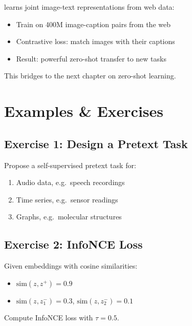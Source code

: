 
 learns joint image-text representations from web data:
\begin{itemize}
    \item Train on 400M image-caption pairs from the web
    \item Contrastive loss: match images with their captions
    \item Result: powerful zero-shot transfer to new tasks
\end{itemize}

This bridges to the next chapter on zero-shot learning.



\newpage
\section{Examples \& Exercises}

\subsection{Exercise 1: Design a Pretext Task}

Propose a self-supervised pretext task for:
\begin{enumerate}
    \item Audio data, e.g.\ speech recordings
    \item Time series, e.g.\ sensor readings
    \item Graphs, e.g.\ molecular structures
\end{enumerate}

\subsection{Exercise 2: InfoNCE Loss}

Given embeddings with cosine similarities:
\begin{itemize}
    \item $\text{sim}(z, z^+) = 0.9$
    \item $\text{sim}(z, z^-_1) = 0.3$, $\text{sim}(z, z^-_2) = 0.1$
\end{itemize}

Compute InfoNCE loss with $\tau = 0.5$.

